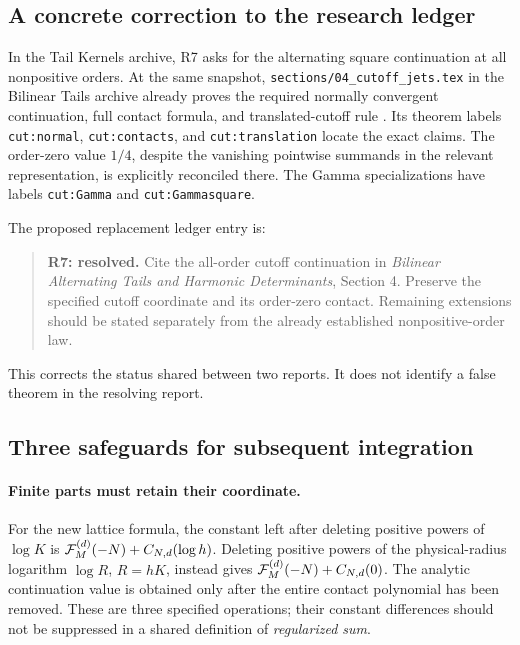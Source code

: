 \documentclass[11pt,letterpaper]{article}
\numberwithin{equation}{section}
\theoremstyle{definition}
\theoremstyle{remark}
\begin{document}
\subsection{A concrete correction to the research ledger}

In the Tail Kernels archive, R7 asks for the alternating square
continuation at all nonpositive orders. At the same snapshot,
\texttt{sections/04\_cutoff\_jets.tex} in the Bilinear Tails
archive already proves the required normally convergent
continuation, full contact formula, and translated-cutoff rule
\cite{RepoTailKernels,RepoBilinear}. Its theorem labels
\texttt{cut:normal}, \texttt{cut:contacts}, and
\texttt{cut:translation} locate the exact claims.
The order-zero value \(1/4\), despite the vanishing
pointwise summands in the relevant representation, is explicitly
reconciled there. The Gamma specializations have labels
\texttt{cut:Gamma} and \texttt{cut:Gammasquare}.

The proposed replacement ledger entry is:
\begin{quote}
\textbf{R7: resolved.} Cite the all-order cutoff continuation in
\emph{Bilinear Alternating Tails and Harmonic Determinants},
Section 4. Preserve the specified cutoff coordinate and its
order-zero contact. Remaining extensions should be stated
separately from the already established nonpositive-order law.
\end{quote}
This corrects the status shared between two reports. It does not
identify a false theorem in the resolving report.

\subsection{Three safeguards for subsequent integration}

\paragraph{Finite parts must retain their coordinate.}
For the new lattice formula, the constant left after deleting
positive powers of \(\log K\) is
\({\cal F}_M^{(d)}(-N)+C_{N,d}(\log h)\).
Deleting positive powers of the physical-radius logarithm
\(\log R\), \(R=hK\), instead gives
\({\cal F}_M^{(d)}(-N)+C_{N,d}(0)\).
The analytic continuation value is obtained only after the entire
contact polynomial has been removed. These are three specified
operations; their constant differences should not be suppressed
in a shared definition of \emph{regularized sum}.
\end{document}
